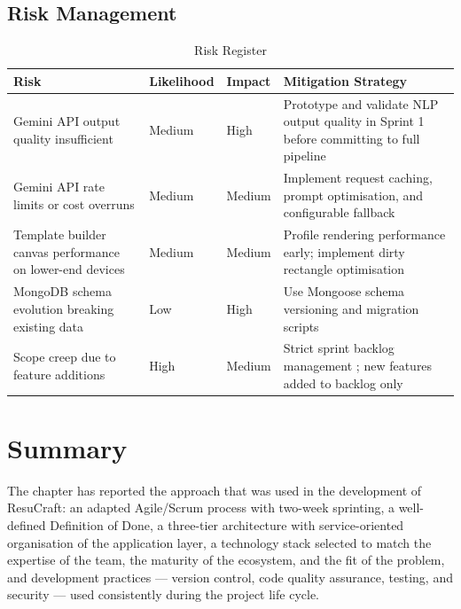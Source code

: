 \documentclass[12pt, a4paper, oneside]{report}
\begin{document}
\subsection{Risk Management}

\begin{table}[H]
\centering
\caption{Risk Register}
\label{tab:risk_register}
\renewcommand{\arraystretch}{1.5}
\begin{tabularx}{\textwidth}{|X|p{2cm}|p{2cm}|X|}
\hline
\textbf{Risk} & \textbf{Likelihood} & \textbf{Impact} & \textbf{Mitigation Strategy} \\
\hline
Gemini API output quality insufficient \cite{geminidocs2024} & Medium & High & Prototype and validate NLP output quality in Sprint 1 before committing to full pipeline \\
\hline
Gemini API rate limits or cost overruns & Medium & Medium & Implement request caching, prompt optimisation, and configurable fallback \\
\hline
Template builder canvas performance on lower-end devices & Medium & Medium & Profile rendering performance early; implement dirty rectangle optimisation \\
\hline
MongoDB schema evolution breaking existing data & Low & High & Use Mongoose schema versioning and migration scripts \\
\hline
Scope creep due to feature additions & High & Medium & Strict sprint backlog management \cite{scrum2020}; new features added to backlog only \\
\hline
\end{tabularx}
\end{table}

\section{Summary}

The chapter has reported the approach that was used in the development of ResuCraft: an adapted Agile/Scrum process\cite{scrum2020} with two-week sprinting, a well-defined Definition of Done, a three-tier architecture with service-oriented organisation of the application layer, a technology stack selected to match the expertise of the team, the maturity of the ecosystem, and the fit of the problem, and development practices --- version control, code quality assurance, testing\cite{cypress2024}, and security \cite{owasp2021} --- used consistently during the project life cycle.

\end{document}
